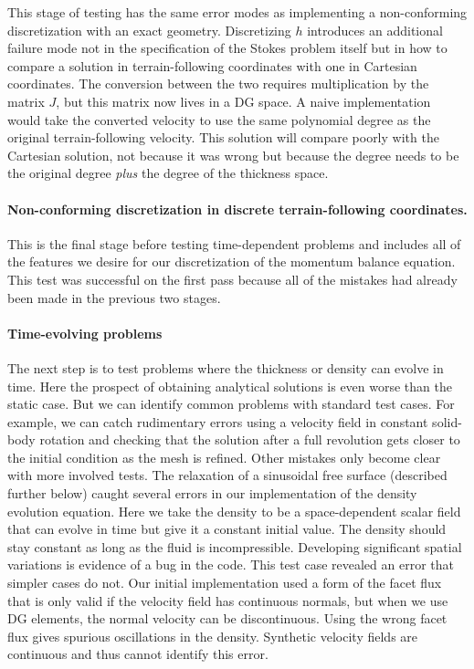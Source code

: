 \documentclass[gmd, manuscript]{copernicus}
\begin{document}
This stage of testing has the same error modes as implementing a non-conforming discretization with an exact geometry.
Discretizing $h$ introduces an additional failure mode not in the specification of the Stokes problem itself but in how to compare a solution in terrain-following coordinates with one in Cartesian coordinates.
The conversion between the two requires multiplication by the matrix $J$, but this matrix now lives in a DG space.
A naive implementation would take the converted velocity to use the same polynomial degree as the original terrain-following velocity.
This solution will compare poorly with the Cartesian solution, not because it was wrong but because the degree needs to be the original degree \emph{plus} the degree of the thickness space.

\paragraph{Non-conforming discretization in discrete terrain-following coordinates.}
This is the final stage before testing time-dependent problems and includes all of the features we desire for our discretization of the momentum balance equation.
This test was successful on the first pass because all of the mistakes had already been made in the previous two stages.

\paragraph{Time-evolving problems}

The next step is to test problems where the thickness or density can evolve in time.
Here the prospect of obtaining analytical solutions is even worse than the static case.
But we can identify common problems with standard test cases.
For example, we can catch rudimentary errors using a velocity field in constant solid-body rotation and checking that the solution after a full revolution gets closer to the initial condition as the mesh is refined.
Other mistakes only become clear with more involved tests.
The relaxation of a sinusoidal free surface (described further below) caught several errors in our implementation of the density evolution equation.
Here we take the density to be a space-dependent scalar field that can evolve in time but give it a constant initial value.
The density should stay constant as long as the fluid is incompressible.
Developing significant spatial variations is evidence of a bug in the code.
This test case revealed an error that simpler cases do not.
Our initial implementation used a form of the facet flux that is only valid if the velocity field has continuous normals, but when we use DG elements, the normal velocity can be discontinuous.
Using the wrong facet flux gives spurious oscillations in the density.
Synthetic velocity fields are continuous and thus cannot identify this error.
\end{document}

